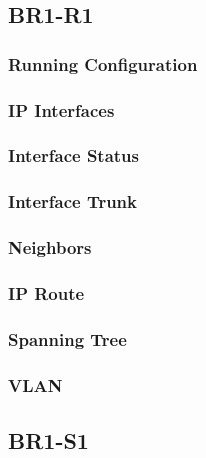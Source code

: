 \subsection{BR1-R1}
\subsubsection{Running Configuration}


\subsubsection{IP Interfaces}


\subsubsection{Interface Status}


\subsubsection{Interface Trunk}


\subsubsection{Neighbors}


\subsubsection{IP Route}


\subsubsection{Spanning Tree}


\subsubsection{VLAN}





\subsection{BR1-S1}
